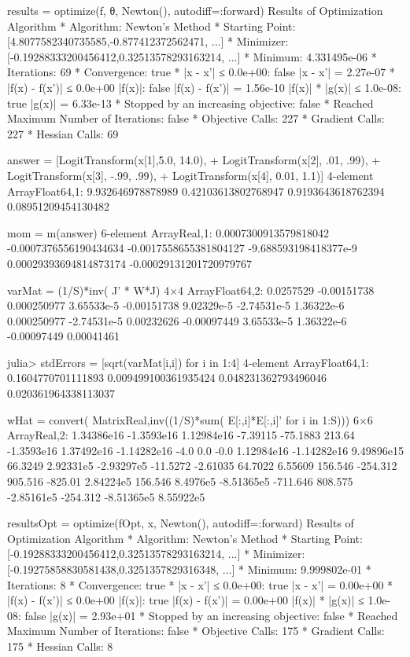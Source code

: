 results = optimize(f, θ, Newton(), autodiff=:forward)
Results of Optimization Algorithm
 * Algorithm: Newton's Method
 * Starting Point: [4.8077582340735585,-0.877412372562471, ...]
 * Minimizer: [-0.19288333200456412,0.32513578293163214, ...]
 * Minimum: 4.331495e-06
 * Iterations: 69
 * Convergence: true
   * |x - x'| ≤ 0.0e+00: false 
     |x - x'| = 2.27e-07 
   * |f(x) - f(x')| ≤ 0.0e+00 |f(x)|: false
     |f(x) - f(x')| = 1.56e-10 |f(x)|
   * |g(x)| ≤ 1.0e-08: true 
     |g(x)| = 6.33e-13 
   * Stopped by an increasing objective: false
   * Reached Maximum Number of Iterations: false
 * Objective Calls: 227
 * Gradient Calls: 227
 * Hessian Calls: 69

answer = [LogitTransform(x[1],5.0, 14.0),
+          LogitTransform(x[2], .01, .99),
+          LogitTransform(x[3], -.99, .99),
+          LogitTransform(x[4], 0.01, 1.1)]
4-element Array{Float64,1}:
 9.932646978878989  
 0.42103613802768947
 0.9193643618762394 
 0.08951209454130482

mom = m(answer)
6-element Array{Real,1}:
  0.0007300913579818042 
 -0.0007376556190434634 
 -0.0017558655381804127 
 -9.688593198418377e-9  
  0.00029393694814873174
  -0.00029131201720979767

varMat = (1/S)*inv( J' * W*J)
4×4 Array{Float64,2}:
  0.0257529    -0.00151738   0.000250977   3.65533e-5
 -0.00151738    9.02329e-5  -2.74531e-5    1.36322e-6
  0.000250977  -2.74531e-5   0.00232626   -0.00097449
  3.65533e-5    1.36322e-6  -0.00097449    0.00041461

julia> stdErrors = [sqrt(varMat[i,i]) for i in 1:4]
4-element Array{Float64,1}:
 0.1604770701111893  
 0.009499100361935424
 0.048231362793496046
 0.020361964338113037
  

wHat = convert( Matrix{Real},inv((1/S)*sum( E[:,i]*E[:,i]' for i in 1:S)))
6×6 Array{Real,2}:
    1.34386e16    -1.3593e16    1.12984e16    -7.39115  -75.1883      213.64     
   -1.3593e16      1.37492e16  -1.14282e16    -4.0        0.0          -0.0      
    1.12984e16    -1.14282e16   9.49896e15    66.3249     2.92331e5    -2.93297e5
  -11.5272        -2.61035     64.7022         6.55609  156.546      -254.312    
  905.516       -825.01         2.84224e5    156.546      8.4976e5     -8.51365e5
 -711.646        808.575       -2.85161e5   -254.312     -8.51365e5     8.55922e5

resultsOpt = optimize(fOpt, x, Newton(), autodiff=:forward)
Results of Optimization Algorithm
 * Algorithm: Newton's Method
 * Starting Point: [-0.19288333200456412,0.32513578293163214, ...]
 * Minimizer: [-0.19275858830581438,0.3251357829316348, ...]
 * Minimum: 9.999802e-01
 * Iterations: 8
 * Convergence: true
   * |x - x'| ≤ 0.0e+00: true 
     |x - x'| = 0.00e+00 
   * |f(x) - f(x')| ≤ 0.0e+00 |f(x)|: true
     |f(x) - f(x')| = 0.00e+00 |f(x)|
   * |g(x)| ≤ 1.0e-08: false 
     |g(x)| = 2.93e+01 
   * Stopped by an increasing objective: false
   * Reached Maximum Number of Iterations: false
 * Objective Calls: 175
 * Gradient Calls: 175
 * Hessian Calls: 8


